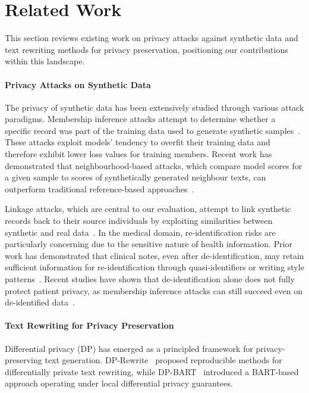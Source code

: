 \section{Related Work}
\label{sec:privacy_related}

This section reviews existing work on privacy attacks against synthetic data and text rewriting methods for privacy preservation, positioning our contributions within this landscape.

\paragraph{Privacy Attacks on Synthetic Data}

The privacy of synthetic data has been extensively studied through various attack paradigms. Membership inference attacks attempt to determine whether a specific record was part of the training data used to generate synthetic samples~\cite{shokri2017membership,carlini2022membership,mattern2023membership}. These attacks exploit models' tendency to overfit their training data and therefore exhibit lower loss values for training members. Recent work has demonstrated that neighbourhood-based attacks, which compare model scores for a given sample to scores of synthetically generated neighbour texts, can outperform traditional reference-based approaches~\cite{mattern2023membership}.

Linkage attacks, which are central to our evaluation, attempt to link synthetic records back to their source individuals by exploiting similarities between synthetic and real data~\cite{narayanan2008robust}. In the medical domain, re-identification risks are particularly concerning due to the sensitive nature of health information. Prior work has demonstrated that clinical notes, even after de-identification, may retain sufficient information for re-identification through quasi-identifiers or writing style patterns~\cite{bencheikhlarbi2023clinical}. Recent studies have shown that de-identification alone does not fully protect patient privacy, as membership inference attacks can still succeed even on de-identified data~\cite{sarkar2024deidentification}.

\paragraph{Text Rewriting for Privacy Preservation}

Differential privacy (DP) has emerged as a principled framework for privacy-preserving text generation. DP-Rewrite~\cite{igamberdiev2022dprewrite} proposed reproducible methods for differentially private text rewriting, while DP-BART~\cite{igamberdiev2023dpbart} introduced a BART-based approach operating under local differential privacy guarantees.

